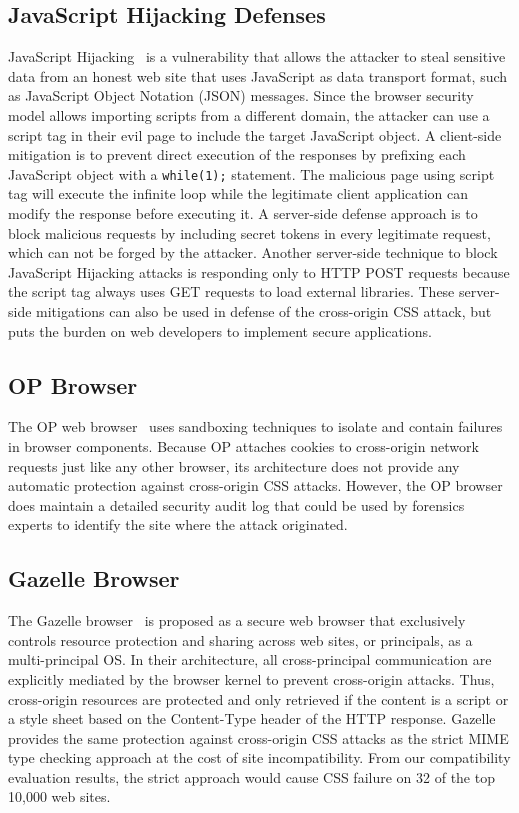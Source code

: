 \documentclass{acm_proc_article-sp}
\begin{document}
\subsection{JavaScript Hijacking Defenses}
JavaScript Hijacking~\cite{jshijacking} is a vulnerability that allows the attacker to steal sensitive data from an honest web site that uses JavaScript as data transport format, such as JavaScript Object Notation (JSON) messages. Since the browser security model allows importing scripts from a different domain, the attacker can use a script tag in their evil page to include the target JavaScript object. A client-side mitigation is to prevent direct execution of the responses by prefixing each JavaScript object with a \texttt{while(1);} statement. The malicious page using script tag will execute the infinite loop while the legitimate client application can modify the response before executing it. A server-side defense approach is to block malicious requests by including secret tokens in every legitimate request, which can not be forged by the attacker. Another server-side technique to block JavaScript Hijacking attacks is responding only to HTTP POST requests because the script tag always uses GET requests to load external libraries. These server-side mitigations can also be used in defense of the cross-origin CSS attack, but puts the burden on web developers to implement secure applications.

\subsection{OP Browser}
The OP web browser~\cite{op-browser} uses sandboxing techniques to isolate and
contain failures in browser components. Because OP attaches cookies to
cross-origin network requests just like any other browser, its architecture
does not provide any automatic protection against cross-origin CSS attacks.
However, the OP browser does maintain a detailed security audit log that could
be used by forensics experts to identify the site where the attack originated.

\subsection{Gazelle Browser}
The Gazelle browser~\cite{gazelle} is proposed as a secure web browser that exclusively controls resource protection and sharing across web sites, or principals, as a multi-principal OS. In their architecture, all cross-principal communication are explicitly mediated by the browser kernel to prevent cross-origin attacks. Thus, cross-origin resources are protected and only retrieved if the content is a script or a style sheet based on the Content-Type header of the HTTP response. Gazelle provides the same protection against cross-origin CSS attacks as the strict MIME type checking approach at the cost of site incompatibility. From our compatibility evaluation results, the strict approach would cause CSS failure on 32 of the top 10,000 web sites.
\end{document}
